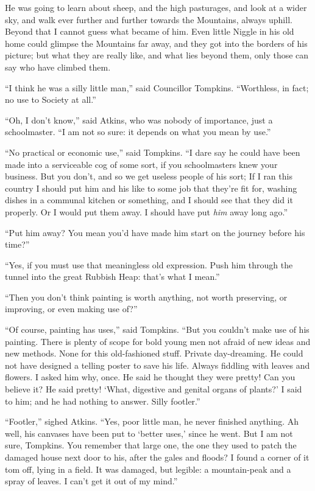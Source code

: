 \documentclass[english]{scrartcl}
\begin{document}
He was going to learn about sheep, and the high pasturages, and look at a wider sky, and walk ever further and further towards the Mountains, always uphill. Beyond that I cannot guess what became of him. Even little Niggle in his old home could glimpse the Mountains far away, and they got into the borders of his picture; but what they are really like, and what lies beyond them, only those can say who have climbed them.

“I think he was a silly little man,” said Councillor Tompkins. “Worthless, in fact; no use to Society at all.”

“Oh, I don’t know,” said Atkins, who was nobody of importance, just a schoolmaster. “I am not so sure: it depends on what you mean by use.”

“No practical or economic use,” said Tompkins. “I dare say he could have been made into a serviceable cog of some sort, if you schoolmasters knew your business. But you don’t, and so we get useless people of his sort; If I ran this country I should put him and his like to some job that they’re fit for, washing dishes in a communal kitchen or something, and I should see that they did it properly. Or I would put them away. I should have put \emph{him} away long ago.”

“Put him away? You mean you’d have made him start on the journey before his time?”

“Yes, if you must use that meaningless old expression. Push him through the tunnel into the great Rubbish Heap: that’s what I mean.”

“Then you don’t think painting is worth anything, not worth preserving, or improving, or even making use of?”

“Of course, painting has uses,” said Tompkins. “But you couldn’t make use of his painting. There is plenty of scope for bold young men not afraid of new ideas and new methods. None for this old-fashioned stuff. Private day-dreaming. He could not have designed a telling poster to save his life. Always fiddling with leaves and flowers. I asked him why, once. He said he thought they were pretty! Can you believe it? He said pretty! ‘What, digestive and genital organs of plants?’ I said to him; and he had nothing to answer. Silly footler.”

“Footler,” sighed Atkins. “Yes, poor little man, he never finished anything. Ah well, his canvases have been put to ‘better uses,’ since he went. But I am not sure, Tompkins. You remember that large one, the one they used to patch the damaged house next door to his, after the gales and floods? I found a corner of it tom off, lying in a field. It was damaged, but legible: a mountain-peak and a spray of leaves. I can’t get it out of my mind.”
\end{document}
